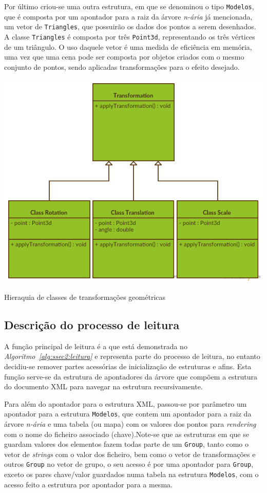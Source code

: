 Por último criou-se uma outra estrutura, em que se denominou o tipo
\texttt{Modelos}, que é composta por um apontador para a raiz da árvore
\emph{n-ária} já mencionada, um vetor de \texttt{Triangles}, que
possuirão os dados dos pontos a serem desenhados. A classe \texttt{Triangles}
é composta por três \texttt{Point3d}, representando os três vértices de um
triângulo. O uso daquele vetor é uma medida de eficiência em memória, uma vez
que uma cena pode ser composta por objetos criados com o mesmo conjunto de
pontos, sendo aplicadas transformações para o efeito desejado.

\begin{center} 	
\includegraphics[width=\textwidth,height=\textheight,keepaspectratio]{resources/classes.png}
\captionsetup{type=figure, width=0.8\linewidth}
\caption{Hieraquia de classes de transformações geométricas}
\label{fig:ssec2:class} 
\end{center}
\subsection{Descrição do processo de leitura}

A função principal de leitura é a que está demonstrada no
\emph{Algoritmo~\ref{alg:ssec2:leitura}} e representa parte do processo de
leitura, no entanto decidiu-se remover partes acessórias de inicialização de
estruturas e afins. Esta função serve-se da estrutura de apontadores da árvore
que compõem a estrutura do documento XML para navegar na estrutura
recursivamente. 

Para além do apontador para o estrutura XML, passou-se por
parâmetro um apontador para a estrutura \texttt{Modelos}, que contem um
apontador para a raiz da árvore \emph{n-ária} e uma tabela (ou mapa) com os
valores dos pontos para \emph{rendering} com o nome do ficheiro associado
(chave).Note-se que as estruturas em que se guardam valores dos elementos fazem
todas parte de um \texttt{Group}, tanto como o vetor de
\emph{strings} com o valor dos ficheiro, bem como o vetor de transformações
e outros \texttt{Group} no vetor de grupo, o seu acesso é por uma apontador
para \texttt{Group}, exceto os pares chave/valor guardados numa tabela na
estrutura \texttt{Modelos}, com o acesso feito a estrutura por apontador para
a mesma.  

